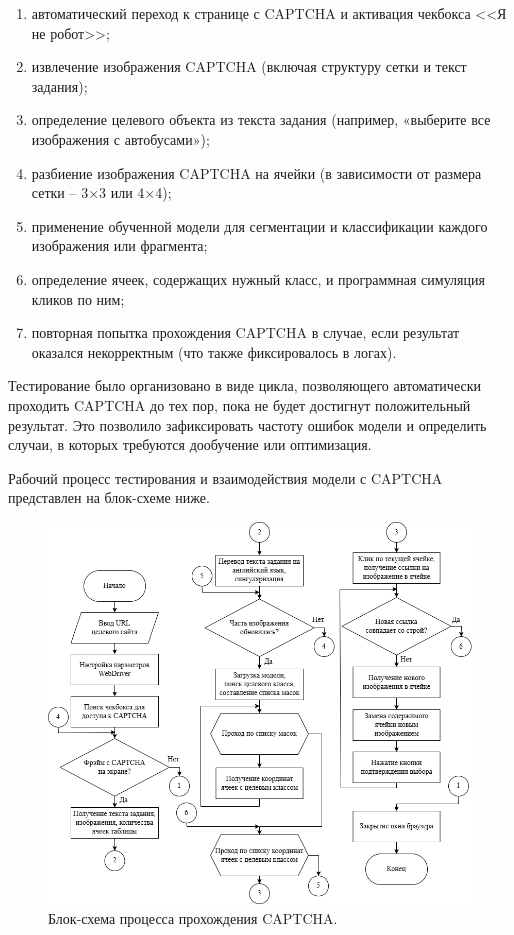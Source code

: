 \begin{enumerate}
    \item автоматический переход к странице с CAPTCHA и активация чекбокса <<Я не 
    робот>>;
    \item извлечение изображения CAPTCHA (включая структуру сетки и текст 
    задания);
    \item определение целевого объекта из текста задания (например, «выберите все 
    изображения с автобусами»);
    \item разбиение изображения CAPTCHA на ячейки (в зависимости от размера сетки 
    -- 3×3 или 4×4);
    \item применение обученной модели для сегментации и классификации каждого 
    изображения или фрагмента;
    \item определение ячеек, содержащих нужный класс, и программная симуляция 
    кликов по ним;
    \item повторная попытка прохождения CAPTCHA в случае, если результат оказался 
    некорректным (что также фиксировалось в логах).
\end{enumerate}

Тестирование было организовано в виде цикла, позволяющего автоматически проходить 
CAPTCHA до тех пор, пока не будет достигнут положительный результат. Это 
позволило зафиксировать частоту ошибок модели и определить случаи, в которых 
требуются дообучение или оптимизация.

Рабочий процесс тестирования и взаимодействия модели с CAPTCHA представлен на 
блок-схеме ниже.

\begin{figure}[H]
    \centering
    \includegraphics[width=1\textwidth]{imgs/imagecaptcha/solve_captcha_flow.png}
    \caption{Блок-схема процесса прохождения CAPTCHA.}
    \label{fig:solve-captcha}
\end{figure}
\vspace{-0.5cm}

